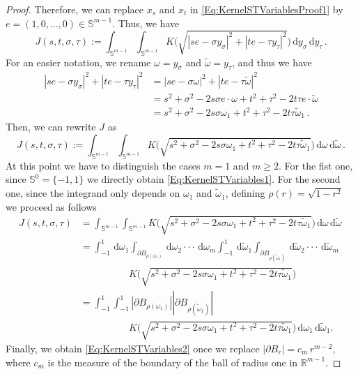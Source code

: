 \documentclass[12pt,reqno]{amsart}
\theoremstyle{definition}
\theoremstyle{remark}
\newcommand{\con}[1]{\mathbb{#1}}
\newcommand{\R}{\con{R}} %
\newcommand{\Sph}{\con{S}} %
\renewcommand{\d}{\,\mathrm{d}} %
\numberwithin{equation}{section}
\begin{document}
\begin{proof}
	Therefore, we can replace $x_s$ and $x_t$ in \eqref{Eq:KernelSTVariablesProof1} by $e =(1,0,\ldots,0) \in \Sph^{m-1}$. Thus, we have
	\begin{equation*}
	J(s,t,\sigma, \tau) := \int_{\Sph^{m-1}}  \int_{\Sph^{m-1}} K\Big( \sqrt{|s e - \sigma y_\sigma|^2 + |t e - \tau y_\tau|^2 }\Big) \d y_\sigma \d y_\tau \,.
	\end{equation*}
	For an easier notation, we rename $\omega = y_\sigma$ and $\tilde\omega = y_\tau$, and thus we have
	\begin{align*}
	|s e - \sigma y_\sigma|^2 + |t e - \tau y_\tau|^2 &= |s e - \sigma \omega|^2 + |t e - \tau \tilde\omega|^2\\
	&= s^2 +\sigma^2 - 2 s \sigma e \cdot \omega + t^2 + \tau^2 - 2 t \tau e\cdot \tilde\omega \\
	&= s^2 +\sigma^2 - 2 s \sigma \omega_1 + t^2 + \tau^2 - 2t \tau\tilde\omega_1\,.
	\end{align*}
	Then, we can rewrite $J$ as
	\begin{equation*}
	\label{Eq:KernelSTVariablesProof3}
	J(s,t,\sigma, \tau) := \int_{\Sph^{m-1}}  \int_{\Sph^{m-1}} K\Big( \sqrt{s^2+\sigma^2- 2 s \sigma \omega_1 + t^2 + \tau^2 - 2t \tau\tilde\omega_1}\Big) \d \omega \d \tilde\omega \,.
	\end{equation*}
	At this point we have to distinguish the cases $m=1$ and $m\geq 2$. For the fist one, since
	$\Sph^{0} = \{-1,1\}$ we directly obtain \eqref{Eq:KernelSTVariables1}. For the second one,
	since the integrand only depends on $\omega_1$ and $\tilde\omega_1$, defining $\rho(r) = \sqrt{1-r^2}$ we proceed as follows
	\begin{align*}
	\label{Eq:KernelSTVariablesProof4}
	J(s,t,\sigma, \tau) &= \int_{\Sph^{m-1}}  \int_{\Sph^{m-1}} K\Big( \sqrt{s^2+\sigma^2- 2 s \sigma \omega_1 + t^2 + \tau^2 - 2t \tau\tilde\omega_1}\Big) \d \omega \d \tilde\omega \,\\
	&= \int_{-1}^1 \d \omega_1 \int_{\partial B_{\rho(\omega_1)}} \d \omega_2\cdot\cdot\cdot\d \omega_m \int_{-1}^1 \d \tilde\omega_1 \int_{\partial B_{\rho(\tilde\omega_1)}} \d \tilde\omega_2\cdot\cdot\cdot\d \tilde\omega_m  \\
	& \quad \quad \quad \quad \quad K\Big( \sqrt{s^2+\sigma^2- 2 s \sigma \omega_1 + t^2 + \tau^2 - 2t \tau\tilde\omega_1}\Big) \, \\
	&= \int_{-1}^1 \int_{-1}^1  |\partial B_{\rho(\omega_1)}| |\partial B_{\rho(\tilde\omega_1)}|\,\\
	& \quad \quad \quad \quad \quad K\Big( \sqrt{s^2+\sigma^2- 2 s \sigma \omega_1 + t^2 + \tau^2 - 2t \tau\tilde\omega_1}\Big) \d \omega_1 \d \tilde\omega_1 .
	\end{align*}
	Finally, we obtain \eqref{Eq:KernelSTVariables2} once we replace
	$|\partial B_{r}|=c_m\,r^{m-2}$, where $c_m$ is the measure of the boundary of the ball of radius one in
	$\R^{m-1}$.
\end{proof}
\end{document}
